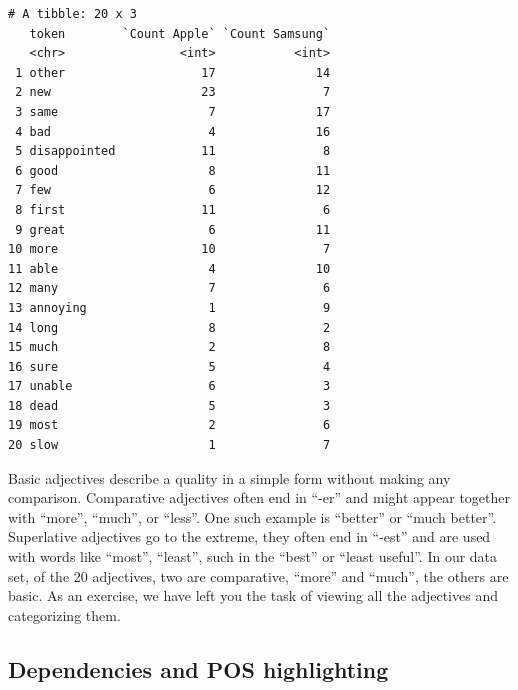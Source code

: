 \begin{verbatim}
# A tibble: 20 x 3
   token        `Count Apple` `Count Samsung`
   <chr>                <int>           <int>
 1 other                   17              14
 2 new                     23               7
 3 same                     7              17
 4 bad                      4              16
 5 disappointed            11               8
 6 good                     8              11
 7 few                      6              12
 8 first                   11               6
 9 great                    6              11
10 more                    10               7
11 able                     4              10
12 many                     7               6
13 annoying                 1               9
14 long                     8               2
15 much                     2               8
16 sure                     5               4
17 unable                   6               3
18 dead                     5               3
19 most                     2               6
20 slow                     1               7
\end{verbatim}

Basic adjectives describe a quality in a simple form without making any
comparison. Comparative adjectives often end in ``-er'' and might appear
together with ``more'', ``much'', or ``less''. One such example is
``better'' or ``much better''. Superlative adjectives go to the extreme,
they often end in ``-est'' and are used with words like ``most'',
``least'', such in the ``best'' or ``least useful''. In our data set, of the
20 adjectives, two are comparative, ``more'' and ``much'', the
others are basic. As an exercise, we have left you the task of viewing all the
adjectives and categorizing them.

\subsection{Dependencies and POS
highlighting}\label{dependencies-and-pos-highlighting}

